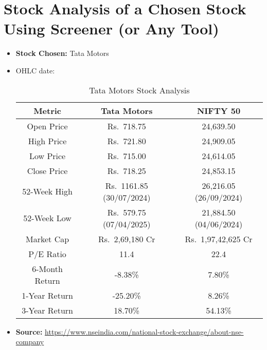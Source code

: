 \documentclass{article}
\begin{document}
\section{Stock Analysis of a Chosen Stock Using Screener (or Any Tool)}
\begin{itemize}
    \item \textbf{Stock Chosen: }Tata Motors
    \item OHLC date: \date{23/05/2025}
\begin{table}[h]
    \centering
    \begin{tabular}{|c|c|c|}
        \hline
        \textbf{Metric} & \textbf{Tata Motors} & \textbf{NIFTY 50} \\
        \hline
        Open Price & Rs.\ 718.75 & 24,639.50 \\
        High Price & Rs.\ 721.80 & 24,909.05 \\
        Low Price & Rs.\ 715.00 & 24,614.05 \\
        Close Price & Rs.\ 718.25 & 24,853.15 \\
        52-Week High & Rs.\ 1161.85 (30/07/2024) & 26,216.05 (26/09/2024) \\
        52-Week Low & Rs.\ 579.75 (07/04/2025) & 21,884.50 (04/06/2024) \\
        Market Cap & Rs.\ 2,69,180 Cr & Rs.\ 1,97,42,625 Cr \\
        P/E Ratio & 11.4 & 22.4 \\
        6-Month Return & -8.38\% & 7.80\% \\
        1-Year Return & -25.20\% & 8.26\% \\
        3-Year Return & 18.70\% & 54.13\% \\
        \hline
    \end{tabular}
    \caption{Tata Motors Stock Analysis}
\end{table}
    \item \textbf{Source: } \href{https://www.nseindia.com/national-stock-exchange/about-nse-company}{https://www.nseindia.com/national-stock-exchange/about-nse-company}
\end{itemize}
\end{document}
